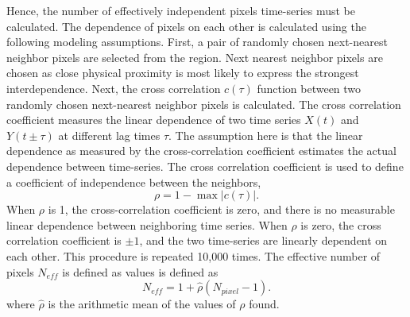 \documentclass[onecolumn]{emulateapj}
\newcommand{\BF}{ }
\begin{document}
Hence, the number of effectively independent pixels time-series must
be calculated. {\BF The dependence of pixels on each other is
  calculated using the following modeling assumptions.}  First, a pair
of randomly chosen next-nearest neighbor pixels are selected from the
region.  Next nearest neighbor pixels are chosen as close physical
proximity is most likely to express the strongest interdependence.
Next, the cross correlation $c(\tau)$ function between two randomly
chosen next-nearest neighbor pixels is calculated.  The cross
correlation coefficient measures the linear dependence of two time
series $X(t)$ and $Y(t \pm \tau)$ at different lag {\BF times $\tau$.
  The assumption here is that the linear dependence as measured by the
  cross-correlation coefficient estimates the actual dependence
  between time-series.}  The cross correlation coefficient is used to
define a coefficient of independence between the neighbors,
\begin{equation}
\label{eqn:ind}
\rho = 1 - \max|c(\tau)|.
\end{equation}
When $\rho$ is 1, the cross-correlation coefficient is zero, and there
is no measurable linear dependence between neighboring time series.
When $\rho$ is zero, the cross correlation coefficient is $\pm 1$, and
the two time-series are linearly dependent on each other.  This
procedure is repeated 10,000 times.  The effective number of pixels
$N_{eff}$ is defined as values is defined as
\begin{equation}\label{eqn:neff}
\label{eqn:nind}
N_{eff}= 1 + \hat{\rho}(N_{pixel}-1).
\end{equation}
where $\hat{\rho}$ is the arithmetic mean of the values of $\rho$
found.
\end{document}
